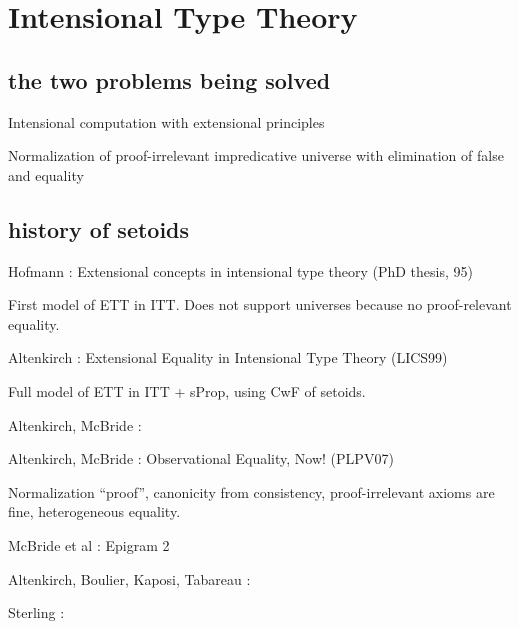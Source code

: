 \setchapterpreamble[u]{\margintoc}
\chapter{Intensional Type Theory}

\section{the two problems being solved}

Intensional computation with extensional principles

Normalization of proof-irrelevant impredicative universe with elimination of false and equality

\section{history of setoids}

Hofmann : Extensional concepts in intensional type theory (PhD thesis, 95)

First model of ETT in ITT. Does not support universes because no proof-relevant equality.

Altenkirch : Extensional Equality in Intensional Type Theory (LICS99)

Full model of ETT in ITT + sProp, using CwF of setoids.

Altenkirch, McBride : 

Altenkirch, McBride : Observational Equality, Now! (PLPV07)

Normalization ``proof'', canonicity from consistency, proof-irrelevant axioms 
are fine, heterogeneous equality.

McBride et al : Epigram 2

Altenkirch, Boulier, Kaposi, Tabareau :

Sterling :
